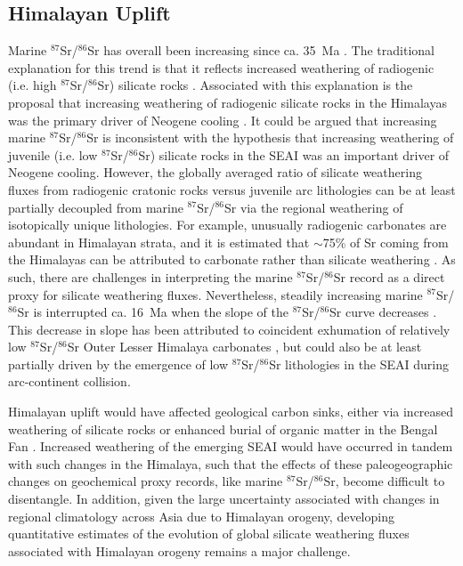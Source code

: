 \documentclass[9pt,twocolumn,twoside,lineno]{pnas-new}
\newcommand{\SrSr}{$^{87}$Sr/$^{86}$Sr\xspace}
\begin{document}
\begin{figure}[h!]
    \label{fig:weatherability_curves}
\end{figure}

\subsection*{Himalayan Uplift}

Marine \SrSr has overall been increasing since ca. 35~Ma \cite{McArthur2012a}. The traditional explanation for this trend is that it reflects increased weathering of radiogenic (i.e. high \SrSr) silicate rocks \cite{Raymo1988a}. Associated with this explanation is the proposal that increasing weathering of radiogenic silicate rocks in the Himalayas was the primary driver of Neogene cooling \cite{Raymo1992a, Edmond1992a}. It could be argued that increasing marine \SrSr is inconsistent with the hypothesis that increasing weathering of juvenile (i.e. low \SrSr) silicate rocks in the SEAI was an important driver of Neogene cooling. However, the globally averaged ratio of silicate weathering fluxes from radiogenic cratonic rocks versus juvenile arc lithologies can be at least partially decoupled from marine \SrSr via the regional weathering of isotopically unique lithologies. For example, unusually radiogenic carbonates are abundant in Himalayan strata, and it is estimated that $\sim$75\% of Sr coming from the Himalayas can be attributed to carbonate rather than silicate weathering \cite{Jacobson2002a, Quade2003a, Oliver2003a}. As such, there are challenges in interpreting the marine \SrSr record as a direct proxy for silicate weathering fluxes. Nevertheless, steadily increasing marine \SrSr is interrupted ca. 16~Ma when the slope of the \SrSr curve decreases \cite{McArthur2012a}. This decrease in slope has been attributed to coincident exhumation of relatively low \SrSr Outer Lesser Himalaya carbonates \cite{Myrow2015a, Colleps2018a}, but could also be at least partially driven by the emergence of low \SrSr lithologies in the SEAI during arc-continent collision.

Himalayan uplift would have affected geological carbon sinks, either via increased weathering of silicate rocks \cite{Raymo1992a} or enhanced burial of organic matter in the Bengal Fan \cite{Galy2007a}. Increased weathering of the emerging SEAI would have occurred in tandem with such changes in the Himalaya, such that the effects of these paleogeographic changes on geochemical proxy records, like marine \SrSr, become difficult to disentangle. In addition, given the large uncertainty associated with changes in regional climatology across Asia due to Himalayan orogeny, developing quantitative estimates of the evolution of global silicate weathering fluxes associated with Himalayan orogeny remains a major challenge.
\end{document}
